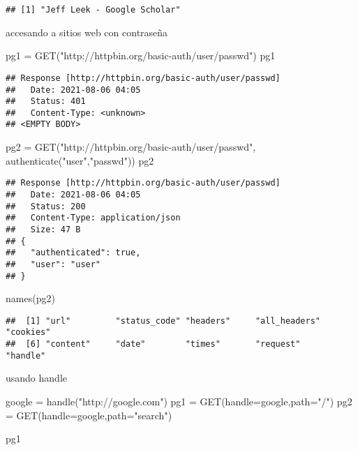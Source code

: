 \documentclass[
]{article}
\newenvironment{Shaded}{\begin{snugshade}}{\end{snugshade}}
\newcommand{\AttributeTok}[1]{\textcolor[rgb]{0.77,0.63,0.00}{#1}}
\newcommand{\FunctionTok}[1]{\textcolor[rgb]{0.00,0.00,0.00}{#1}}
\newcommand{\NormalTok}[1]{#1}
\newcommand{\OtherTok}[1]{\textcolor[rgb]{0.56,0.35,0.01}{#1}}
\newcommand{\StringTok}[1]{\textcolor[rgb]{0.31,0.60,0.02}{#1}}
\begin{document}
\begin{verbatim}
## [1] "Jeff Leek - Google Scholar"
\end{verbatim}

accesando a sitios web con contraseña

\begin{Shaded}
\begin{Highlighting}[]
\NormalTok{pg1 }\OtherTok{=} \FunctionTok{GET}\NormalTok{(}\StringTok{"http://httpbin.org/basic{-}auth/user/passwd"}\NormalTok{)}
\NormalTok{pg1}
\end{Highlighting}
\end{Shaded}

\begin{verbatim}
## Response [http://httpbin.org/basic-auth/user/passwd]
##   Date: 2021-08-06 04:05
##   Status: 401
##   Content-Type: <unknown>
## <EMPTY BODY>
\end{verbatim}

\begin{Shaded}
\begin{Highlighting}[]
\NormalTok{pg2 }\OtherTok{=} \FunctionTok{GET}\NormalTok{(}\StringTok{"http://httpbin.org/basic{-}auth/user/passwd"}\NormalTok{,}
    \FunctionTok{authenticate}\NormalTok{(}\StringTok{"user"}\NormalTok{,}\StringTok{"passwd"}\NormalTok{))}
\NormalTok{pg2}
\end{Highlighting}
\end{Shaded}

\begin{verbatim}
## Response [http://httpbin.org/basic-auth/user/passwd]
##   Date: 2021-08-06 04:05
##   Status: 200
##   Content-Type: application/json
##   Size: 47 B
## {
##   "authenticated": true, 
##   "user": "user"
## }
\end{verbatim}

\begin{Shaded}
\begin{Highlighting}[]
\FunctionTok{names}\NormalTok{(pg2)}
\end{Highlighting}
\end{Shaded}

\begin{verbatim}
##  [1] "url"         "status_code" "headers"     "all_headers" "cookies"    
##  [6] "content"     "date"        "times"       "request"     "handle"
\end{verbatim}

usando handle

\begin{Shaded}
\begin{Highlighting}[]
\NormalTok{google }\OtherTok{=} \FunctionTok{handle}\NormalTok{(}\StringTok{"http://google.com"}\NormalTok{)}
\NormalTok{pg1 }\OtherTok{=} \FunctionTok{GET}\NormalTok{(}\AttributeTok{handle=}\NormalTok{google,}\AttributeTok{path=}\StringTok{"/"}\NormalTok{)}
\NormalTok{pg2 }\OtherTok{=} \FunctionTok{GET}\NormalTok{(}\AttributeTok{handle=}\NormalTok{google,}\AttributeTok{path=}\StringTok{"search"}\NormalTok{)}

\NormalTok{pg1}
\end{Highlighting}
\end{Shaded}
\end{document}
